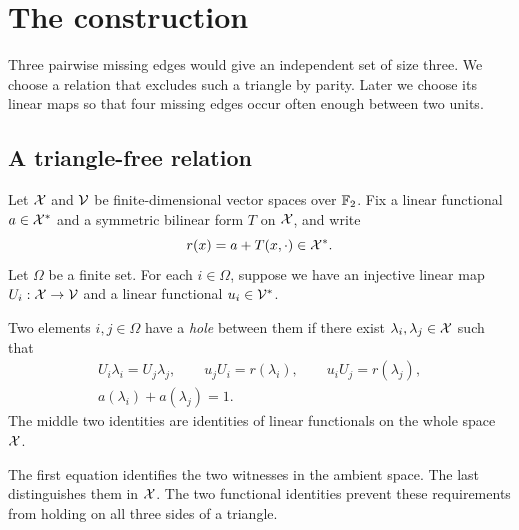 \section{The construction}\label{sec:geometry}

Three pairwise missing edges would give an independent set of size
three. We choose a relation that excludes such a triangle by parity.
Later we choose its linear maps so that four missing edges occur often
enough between two units.

\subsection{A triangle-free relation}

Let \(\mathcal X\) and \(\mathcal V\) be finite-dimensional vector spaces over
\(\mathbb F_2\). Fix a linear functional \(a\in\mathcal X^*\) and a symmetric
bilinear form \(T\) on \(\mathcal X\), and write
\[
 r(x)=a+T(x,\cdot)\in\mathcal X^*.
\]
Let \(\Omega\) be a finite set. For each \(i\in\Omega\), suppose
we have an injective linear map \(U_i:\mathcal X\to\mathcal V\) and a linear
functional \(u_i\in\mathcal V^*\).

\begin{definition}\label{def:hole}
Two elements \(i,j\in\Omega\) have a \emph{hole} between them if
there exist \(\lambda_i,\lambda_j\in\mathcal X\) such that
\begin{equation}\label{eq:hole-equations}
 \begin{gathered}
 U_i\lambda_i=U_j\lambda_j,\qquad
 u_jU_i=r(\lambda_i),\qquad u_iU_j=r(\lambda_j),\\
 a(\lambda_i)+a(\lambda_j)=1.
 \end{gathered}
\end{equation}
The middle two identities are identities of linear functionals on
the whole space \(\mathcal X\).
\end{definition}

The first equation identifies the two witnesses in the ambient space.
The last distinguishes them in \(\mathcal X\). The two functional identities
prevent these requirements from holding on all three sides of a triangle.

